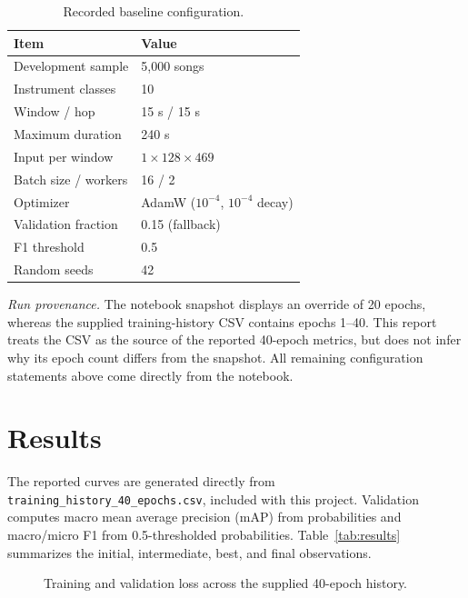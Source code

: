 \documentclass[conference]{IEEEtran}
\begin{document}
\begin{table}[t]
\caption{Recorded baseline configuration.}
\label{tab:config}
\centering\footnotesize
\begin{tabular}{ll}
\toprule
Item & Value \\
\midrule
Development sample & 5,000 songs \\
Instrument classes & 10 \\
Window / hop & 15 s / 15 s \\
Maximum duration & 240 s \\
Input per window & $1\times128\times469$ \\
Batch size / workers & 16 / 2 \\
Optimizer & AdamW ($10^{-4}$, $10^{-4}$ decay) \\
Validation fraction & 0.15 (fallback) \\
F1 threshold & 0.5 \\
Random seeds & 42 \\
\bottomrule
\end{tabular}
\end{table}

\textit{Run provenance.} The notebook snapshot displays an override of 20 epochs, whereas the supplied training-history CSV contains epochs 1--40. This report treats the CSV as the source of the reported 40-epoch metrics, but does not infer why its epoch count differs from the snapshot. All remaining configuration statements above come directly from the notebook.

\section{Results}
The reported curves are generated directly from \texttt{training\_history\_40\_epochs.csv}, included with this project. Validation computes macro mean average precision (mAP) from probabilities and macro/micro F1 from 0.5-thresholded probabilities. Table~\ref{tab:results} summarizes the initial, intermediate, best, and final observations.

\begin{figure}[t]
\centering
{}
\caption{Training and validation loss across the supplied 40-epoch history.}
\label{fig:loss}
\end{figure}
\end{document}
